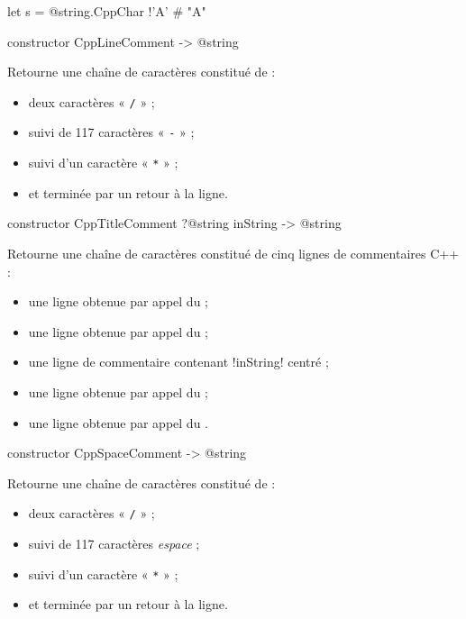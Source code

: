 \begin{galgas}
let s = @string.CppChar {!'A'} # "A"
\end{galgas}




\begin{galgasbox}
constructor CppLineComment -> @string
\end{galgasbox}

Retourne une chaîne de caractères constitué de :
\begin{itemize}
  \item deux caractères « \texttt{/} » ;
  \item suivi de 117 caractères « \texttt{-} » ;
  \item suivi d'un caractère « \texttt{*} » ;
  \item et terminée par un retour à la ligne.
\end{itemize}





\begin{galgasbox}
constructor CppTitleComment ?@string inString -> @string
\end{galgasbox}

Retourne une chaîne de caractères constitué de cinq lignes de commentaires C++ :
\begin{itemize}
\item une ligne obtenue par appel du  ;
\item une ligne obtenue par appel du  ;
\item une ligne de commentaire contenant \ggs!inString! centré ;
\item une ligne obtenue par appel du  ;
\item une ligne obtenue par appel du .
\end{itemize}




\begin{galgasbox}
constructor CppSpaceComment -> @string
\end{galgasbox}

Retourne une chaîne de caractères constitué de :
\begin{itemize}
  \item deux caractères « \texttt{/} » ;
  \item suivi de 117 caractères \emph{espace} ;
  \item suivi d'un caractère « \texttt{*} » ;
  \item et terminée par un retour à la ligne.
\end{itemize}


